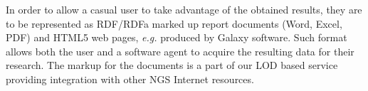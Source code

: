 \documentclass[a4paper]{jpconf}
\begin{document}



In order to allow a casual user to take advantage of the obtained results, they are to be represented as RDF/RDFa marked up report documents (Word, Excel, PDF) and HTML5 web pages, \emph{e.g.} produced by Galaxy software.  Such format allows both the user and a software agent to acquire the resulting data for their research.  The markup for the documents is a part of our LOD based service providing integration with other NGS Internet resources.  %
\end{document}
